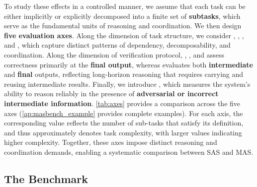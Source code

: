 To study these effects in a controlled manner, we assume that each task can be either {implicitly} or {explicitly} decomposed into a finite set of \textbf{subtasks}, which serve as the fundamental units of reasoning and coordination. We then design \textbf{five evaluation axes}. Along the dimension of task structure, we consider \textbf{\depth}, \textbf{\horizon}, \textbf{\breadth}, and \textbf{\myparallel}, which capture distinct patterns of dependency, decomposability, and coordination. Along the dimension of verification protocol, \depth, \breadth, and \myparallel assess correctness primarily at the \textbf{final output}, whereas \horizon evaluates both \textbf{intermediate} and \textbf{final} outputs, reflecting long-horizon reasoning that requires carrying and reusing intermediate results. Finally, we introduce \textbf{\robustness}, which measures the system’s ability to reason reliably in the presence of \textbf{adversarial or incorrect intermediate information}.
\cref{tab:axes} provides a  comparison across the five axes {(\cref{ap:masbench_example} provides complete examples)}. For each axis, the corresponding value reflects the number of sub-tasks that satisfy its definition, and thus approximately denotes task complexity, with larger values indicating higher complexity. Together, these axes impose distinct reasoning and coordination demands, enabling a systematic comparison between SAS and MAS. 




 

\subsection{The \ourbenchmark Benchmark}
\label{sec:masbench}





